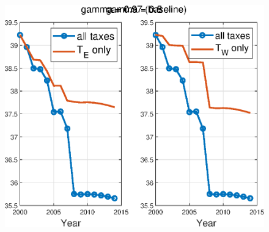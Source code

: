 \documentclass[12pt]{article}
\begin{document}
\begin{figure}[htbp]
\centering
\includegraphics[scale=0.8]{alltax_vs_te_gamma05.eps}
\end{figure}

\begin{tabular}{c}

\end{tabular}
 
\end{document}
